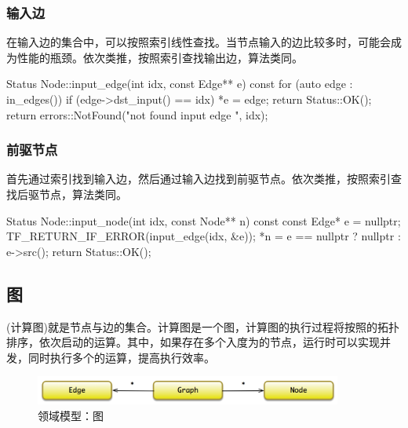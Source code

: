 \begin{content}
\subsubsection{输入边}

在输入边的集合中，可以按照索引线性查找。当节点输入的边比较多时，可能会成为性能的瓶颈。依次类推，按照索引查找输出边，算法类同。

\begin{leftbar}
\begin{c++}
Status Node::input_edge(int idx, const Edge** e) const {
  for (auto edge : in_edges()) {
    if (edge->dst_input() == idx) {
      *e = edge;
      return Status::OK();
    }
  }
  return errors::NotFound("not found input edge ", idx);
}
\end{c++}
\end{leftbar}

\subsubsection{前驱节点}

首先通过索引找到输入边，然后通过输入边找到前驱节点。依次类推，按照索引查找后驱节点，算法类同。

\begin{leftbar}
\begin{c++}
Status Node::input_node(int idx, const Node** n) const {
  const Edge* e = nullptr;
  TF_RETURN_IF_ERROR(input_edge(idx, &e));
  *n = e == nullptr ? nullptr : e->src();
  return Status::OK();
}
\end{c++}
\end{leftbar}

\subsection{图}

(计算图)就是节点与边的集合。计算图是一个图，计算图的执行过程将按照的拓扑排序，依次启动的运算。其中，如果存在多个入度为的节点，运行时可以实现并发，同时执行多个的运算，提高执行效率。

\begin{figure}[!htbp]
\centering
\includegraphics[width=0.9\textwidth]{figures/cc-graph-model.png}
\caption{领域模型：图}
 \label{fig:cc-graph-model}
\end{figure}


\end{content}
